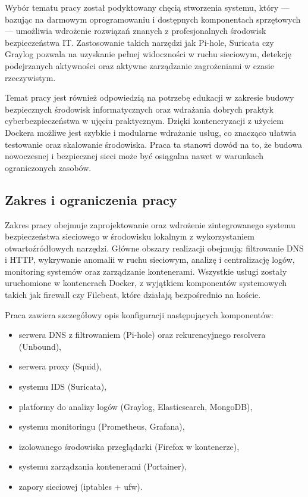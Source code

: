 \documentclass[
    left=2.5cm,         %
    right=2.5cm,        %
    top=2.5cm,          %
    bottom=3cm,         %
    bindingoffset=6mm,  %
    nohyphenation=true %
]{eiti/eiti-thesis} %
\begin{document}
Wybór tematu pracy został podyktowany chęcią stworzenia systemu, który — bazując na darmowym oprogramowaniu i dostępnych komponentach sprzętowych — umożliwia wdrożenie rozwiązań znanych z profesjonalnych środowisk bezpieczeństwa IT. Zastosowanie takich narzędzi jak Pi-hole, Suricata czy Graylog pozwala na uzyskanie pełnej widoczności w ruchu sieciowym, detekcję podejrzanych aktywności oraz aktywne zarządzanie zagrożeniami w czasie rzeczywistym.

Temat pracy jest również odpowiedzią na potrzebę edukacji w zakresie budowy bezpiecznych środowisk informatycznych oraz wdrażania dobrych praktyk cyberbezpieczeństwa w ujęciu praktycznym. Dzięki konteneryzacji z użyciem Dockera możliwe jest szybkie i modularne wdrażanie usług, co znacząco ułatwia testowanie oraz skalowanie środowiska. Praca ta stanowi dowód na to, że budowa nowoczesnej i bezpiecznej sieci może być osiągalna nawet w warunkach ograniczonych zasobów.

\subsection{Zakres i ograniczenia pracy}

Zakres pracy obejmuje zaprojektowanie oraz wdrożenie zintegrowanego systemu bezpieczeństwa sieciowego w środowisku lokalnym z wykorzystaniem otwartoźródłowych narzędzi. Główne obszary realizacji obejmują: filtrowanie DNS i HTTP, wykrywanie anomalii w ruchu sieciowym, analizę i centralizację logów, monitoring systemów oraz zarządzanie kontenerami. Wszystkie usługi zostały uruchomione w kontenerach Docker, z wyjątkiem komponentów systemowych takich jak firewall czy Filebeat, które działają bezpośrednio na hoście.

Praca zawiera szczegółowy opis konfiguracji następujących komponentów:
\begin{itemize}
    \item serwera DNS z filtrowaniem (Pi-hole) oraz rekurencyjnego resolvera (Unbound),
    \item serwera proxy (Squid),
    \item systemu IDS (Suricata),
    \item platformy do analizy logów (Graylog, Elasticsearch, MongoDB),
    \item systemu monitoringu (Prometheus, Grafana),
    \item izolowanego środowiska przeglądarki (Firefox w kontenerze),
    \item systemu zarządzania kontenerami (Portainer),
    \item zapory sieciowej (iptables + ufw).
\end{itemize}
\end{document}
